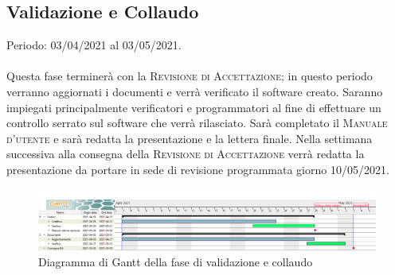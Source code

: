 \documentclass[../piano_di_progetto.tex]{subfiles}
\begin{document}
\subsection{Validazione e Collaudo}%
\label{sub:valid_coll}
Periodo: 03/04/2021 al 03/05/2021.\\ \\ 
Questa fase terminerà con la \textsc{Revisione di Accettazione}; in questo periodo verranno aggiornati i documenti e verrà verificato il software creato. Saranno impiegati principalmente verificatori e programmatori al fine di effettuare un controllo serrato sul software che verrà rilasciato. Sarà completato il \textsc{Manuale d'utente} e sarà redatta la presentazione e la lettera finale. Nella settimana successiva alla consegna della \textsc{Revisione di Accettazione} verrà redatta la presentazione da portare in sede di revisione programmata giorno 10/05/2021.

\begin{figure}[H]
\centering
\includegraphics[width=18cm]{src/img/gantt/04_RA.png}
\caption{Diagramma di Gantt della fase di validazione e collaudo}
\end{figure}
\end{document}
